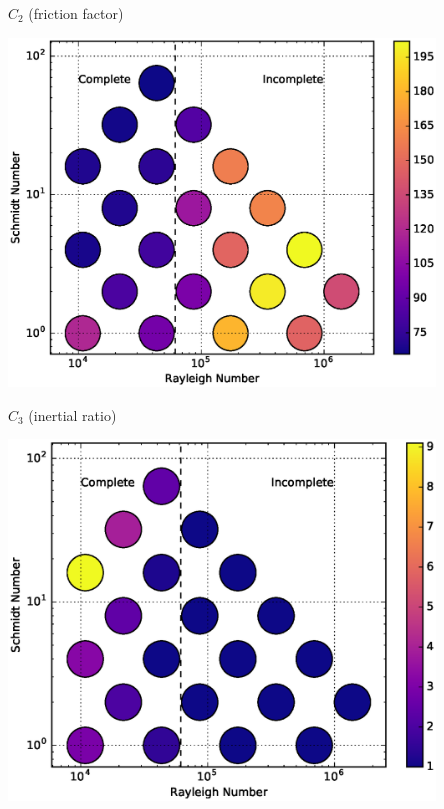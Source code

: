 \documentclass[12pt]{beamer}
\begin{document}
\begin{frame}[t]{$C_2$ (friction factor)}
\begin{center}
\vspace{-11pt}
\includegraphics[width=0.85\textwidth]{graphics/C2-vs-Rayleigh-Schmidt.eps}
\end{center}
\end{frame}

\begin{frame}[t]{$C_3$ (inertial ratio)}
\begin{center}
\vspace{-11pt}
\includegraphics[width=0.85\textwidth]{graphics/C3-vs-Rayleigh-Schmidt.eps}
\end{center}
\end{frame}
\end{document}
